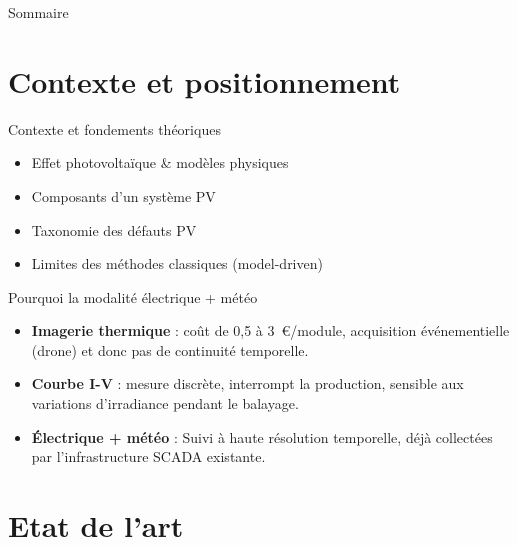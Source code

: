 \documentclass[10pt,aspectratio=169]{beamer}
\begin{document}
\begin{frame}{Sommaire}
  \tableofcontents
\end{frame}

\section{Contexte et positionnement}

\begin{frame}{Contexte et fondements théoriques}
  \begin{itemize}[<+->]
    \item Effet photovoltaïque \& modèles physiques
    \item Composants d'un système PV
    \item Taxonomie des défauts PV
    \item Limites des méthodes classiques (model-driven)
  \end{itemize}
\end{frame}

\begin{frame}{Pourquoi la modalité électrique + météo}
  \begin{itemize}[<+->]
    \item \textbf{Imagerie thermique} : coût de 0,5 à 3~€/module, acquisition événementielle (drone) et donc pas de continuité temporelle.
    \item \textbf{Courbe I-V} : mesure discrète, interrompt la production, sensible aux variations d'irradiance pendant le balayage.
    \item \alert{\textbf{Électrique + météo}} : Suivi à haute résolution temporelle, déjà collectées par l'infrastructure SCADA existante.
  \end{itemize}
  \vfill
\end{frame}

\section{Etat de l'art}
\end{document}
